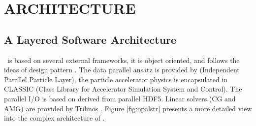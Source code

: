 \documentclass[acus]{JAC2003}
\begin{document}
\section{ARCHITECTURE}
\subsection{A Layered Software Architecture}
\opal\ is based on several external frameworks, it is object oriented, and follows the ideas of design pattern \cite{gammagang}. The data parallel ansatz is provided by  
\ippl (Independent Parallel Particle Layer), the particle accelerator physics is encapsulated in CLASSIC (Class Library for Accelerator Simulation System and Control). The 
parallel I/O is based on \hfifepart \cite{h5part} derived from parallel HDF5. Linear solvers (CG and AMG) are provided by Trilinos \cite{trilinos}. Figure \ref{fig:opalstr} presents a more detailed view into the complex architecture
of \opal. 
\end{document}
